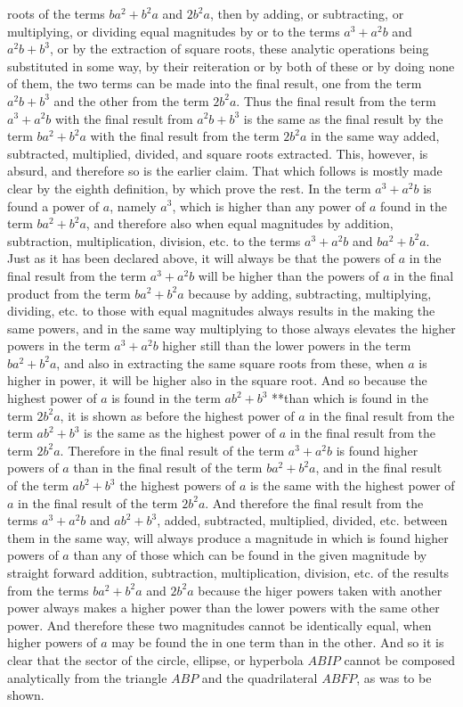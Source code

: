 \documentclass[11pt,letterpaper]{book}
\begin{document}
roots of the terms $ba^{2}+b^{2}a$ and $2b^{2}a$, then by adding, or
subtracting, or multiplying, or dividing equal magnitudes by or to the terms
$a^{3}+a^{2}b$ and $a^{2}b+b^{3}$, or by the extraction of square roots, these
analytic operations being substituted in some way, by their reiteration or by
both of these or by doing none of them, the two terms can be made into the final
result, one from the term $a^{2}b+b^{3}$ and the other from the term $2b^{2}a$. 
Thus the final result from the term $a^{3}+a^{2}b$ with the final result from
$a^{2}b+b^{3}$ is the same as the final result by the term $ba^{2}+b^{2}a$ with
the final result from the term $2b^{2}a$ in the same way added, subtracted,
multiplied, divided, and square roots extracted.
This, however, is absurd, and therefore so is the earlier claim.
That which follows is mostly made clear by the eighth definition, by which
prove the rest.
In the term $a^3+a^2b$ is found a power of $a$, namely $a^3$, which is higher
than any power of $a$ found in the term $ba^2+b^2a$, and therefore also when
equal magnitudes by addition, subtraction, multiplication, division, etc. to
the terms $a^3+a^2b$ and $ba^2+b^2a$.
Just as it has been declared above, it will always be that the powers of $a$ in
the final result from the term $a^3+a^2b$ will be higher than the powers of $a$
in the final product from the term $ba^2+b^2a$ because by adding, subtracting,
multiplying, dividing, etc. to those with equal magnitudes always results in the
making the same powers, and in the same way multiplying to those always elevates
the higher powers in the term $a^3+a^2b$ higher still than the lower powers in
the term $ba^2+b^2a$, and also in extracting the same square roots from these,
when $a$ is higher in power, it will be higher also in the square root.
And so because the highest power of $a$ is found in the term
$ab^2+b^3$ **than which is found in the term $2b^2a$, it is shown as before the
highest power of $a$ in the final result from the term $ab^2+b^3$ is the same as
the highest power of $a$ in the final result from the term $2b^2a$.
Therefore in the final result of the term $a^3+a^2b$ is found higher powers of
$a$ than in the final result of the term $ba^2+b^2a$, and in the final result of
the term $ab^2+b^3$ the highest powers of $a$ is the same with the highest power
of $a$ in the final result of the term $2b^2a$.
And therefore the final result from the terms $a^3+a^2b$ and $ab^2+b^3$, added,
subtracted, multiplied, divided, etc. between them in the same way, will always
produce a magnitude in which is found higher powers of $a$ than any of those
which can be found in the given magnitude by straight forward
addition, subtraction, multiplication, division, etc. of the results from the
terms $ba^2+b^2a$ and $2b^2a$ because the higer powers taken with another power
always makes a higher power than the lower powers with the same other power.
And therefore these two magnitudes cannot be identically equal, when higher
powers of $a$ may be found the in one term than in the other.
And so it is clear that the sector of the circle, ellipse, or hyperbola
$ABIP$ cannot be composed analytically from the triangle $ABP$ and the
quadrilateral $ABFP$, as was to be shown.
\end{document}
